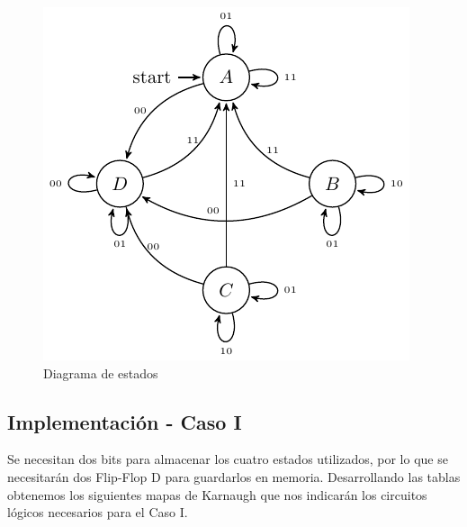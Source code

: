  \begin{figure}[H]
\begin{center}
\includegraphics[scale=0.9]{Ejercicio1/Diagramas/Transiciones}
\caption{Diagrama de estados}
\end{center}
\label{Diagrama_de_estados_Ej1}
\end{figure}

\subsection{Implementación - Caso I}

Se necesitan dos bits para almacenar los cuatro estados utilizados, por lo que se necesitarán dos Flip-Flop D para guardarlos en memoria.
Desarrollando las tablas obtenemos los siguientes mapas de Karnaugh que nos indicarán los circuitos lógicos necesarios para el Caso I.


